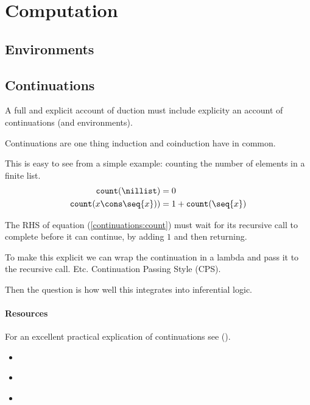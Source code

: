 \section{Computation}\label{sec:computation}

\subsection{Environments}

\subsection{Continuations}

A full and explicit account of duction must include explicity an
account of continuations (and environments).

Continuations are one thing induction and coinduction have in common.

This is easy to see from a simple example: counting the number of
elements in a finite list.
\begin{align}
  \texttt{count}(\nillist) &= 0 \\ \texttt{count}(x\cons\seq{x})) &= 1
  + \texttt{count}(\seq{x}) \label{continuations:count}
\end{align}

The RHS of equation (\ref{continuations:count}) must wait for its
recursive call to complete before it can continue, by adding \(1\) and
then returning.

To make this explicit we can wrap the continuation in a lambda and
pass it to the recursive call. Etc. Continuation Passing Style (CPS).

Then the question is how well this integrates into inferential logic.

\paragraph{Resources}

For an excellent practical explication of continuations see  (\cite{queinnec2003lisp}).

\begin{itemize}
\item {} \cite{Strachey2000ContinuationsAM}
  \item {} \cite{10.1007/BF01019459}
\item {} \cite{10.1145/62678.62684}
\end{itemize}
